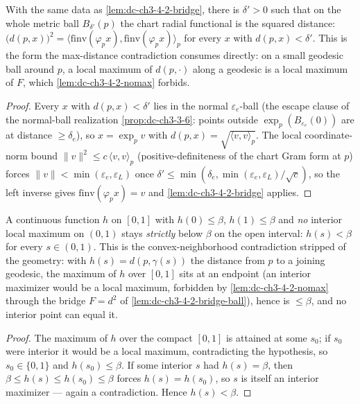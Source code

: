 \begin{lemma}
  \label{lem:dc-ch3-4-2-bridge-ball}
  \leanok
  With the same data as \cref{lem:dc-ch3-4-2-bridge}, there is $\delta'>0$ such that on the whole
  metric ball $B_{\delta'}(p)$ the chart radial functional is the squared distance:
  $\big(d(p,x)\big)^2 = \langle \mathrm{finv}(\varphi_p x), \mathrm{finv}(\varphi_p x)\rangle_p$ for
  every $x$ with $d(p,x)<\delta'$. This is the form the max-distance contradiction consumes
  directly: on a small geodesic ball around $p$, a local maximum of $d(p,\cdot)$ along a geodesic is
  a local maximum of $F$, which \cref{lem:dc-ch3-4-2-nomax} forbids.
\end{lemma}
\begin{proof}
  \sketch
  \leanok
  Every $x$ with $d(p,x)<\delta'$ lies in the normal $\varepsilon_e$-ball (the escape clause of the
  normal-ball realization \cref{prop:dc-ch3-3-6}: points outside $\exp_p(B_{\varepsilon_e}(0))$ are at
  distance $\ge\delta_e$), so $x=\exp_p v$ with $d(p,x)=\sqrt{\langle v,v\rangle_p}$. The local
  coordinate-norm bound $\|v\|^2\le c\,\langle v,v\rangle_p$ (positive-definiteness of the chart Gram
  form at $p$) forces $\|v\|<\min(\varepsilon_e,\varepsilon_L)$ once
  $\delta'\le\min(\delta_e,\min(\varepsilon_e,\varepsilon_L)/\sqrt c)$, so the left inverse gives
  $\mathrm{finv}(\varphi_p x)=v$ and \cref{lem:dc-ch3-4-2-bridge} applies.
\end{proof}

\begin{lemma}
  \label{lem:dc-ch3-4-2-maxdeduction}
  \leanok
  A continuous function $h$ on $[0,1]$ with $h(0)\le\beta$, $h(1)\le\beta$ and \emph{no} interior
  local maximum on $(0,1)$ stays \emph{strictly} below $\beta$ on the open interval: $h(s)<\beta$ for
  every $s\in(0,1)$. This is the convex-neighborhood contradiction stripped of the geometry:
  with $h(s)=d(p,\gamma(s))$ the distance from $p$ to a joining geodesic, the maximum of $h$ over
  $[0,1]$ sits at an endpoint (an interior maximizer would be a local maximum, forbidden by
  \cref{lem:dc-ch3-4-2-nomax} through the bridge $F=d^2$ of \cref{lem:dc-ch3-4-2-bridge-ball}), hence
  is $\le\beta$, and no interior point can equal it.
\end{lemma}
\begin{proof}
  \sketch
  \leanok
  The maximum of $h$ over the compact $[0,1]$ is attained at some $s_0$; if $s_0$ were interior it
  would be a local maximum, contradicting the hypothesis, so $s_0\in\{0,1\}$ and $h(s_0)\le\beta$.
  If some interior $s$ had $h(s)=\beta$, then $\beta\le h(s)\le h(s_0)\le\beta$ forces $h(s)=h(s_0)$,
  so $s$ is itself an interior maximizer — again a contradiction. Hence $h(s)<\beta$.
\end{proof}

